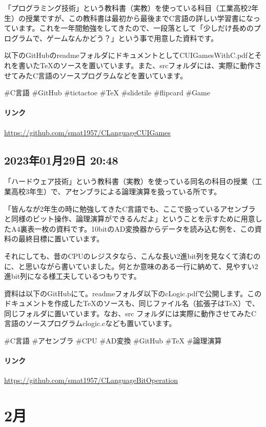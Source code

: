 \documentclass[facebook_diary.tex]{subfiles}
\begin{document}
「プログラミング技術」という教科書（実教）を使っている科目（工業高校2年生）の授業ですが、この教科書は最初から最後までC言語の詳しい学習書になっています。これを一年間勉強をしてきたので、一段落として「少しだけ長めのプログラムで、ゲームなんかどう？」という事で用意した資料です。


以下のGitHubのreadmeフォルダにドキュメントとしてCUIGamesWithC.pdfとそれを書いたTeXのソースを置いています。また、srcフォルダには、実際に動作させてみたC言語のソースプログラムなどを置いています。


\#C言語 \#GitHub \#tictactoe \#TeX \#slidetile \#flipcard \#Game

\paragraph{リンク}
\url{https://github.com/smat1957/CLanguageCUIGames}

\subsection*{2023年01月29日 20:48}

「ハードウェア技術」という教科書（実教）を使っている同名の科目の授業（工業高校3年生）で、アセンブラによる論理演算を扱っている所です。


「皆んなが2年生の時に勉強してきたC言語でも、ここで扱っているアセンブラと同様のビット操作、論理演算ができるんだよ」ということを示すために用意したA4裏表一枚の資料です。10bitのAD変換器からデータを読み込む例を、この資料の最終目標に置いています。

それにしても、昔のCPUのレジスタなら、こんな長い2進bit列を見なくて済むのに、と思いながら書いていました。何とか意味のある一行に納めて、見やすい2進bit列になる様工夫しているつもりです。


資料は以下のGitHubにて。readmeフォルダ以下のcLogic.pdfで公開します。このドキュメントを作成したTeXのソースも、同じファイル名（拡張子はTeX）で、同じフォルダに置いています。なお、src フォルダには実際に動作させてみたC言語のソースプログラムclogic.cなども置いています。


\#C言語 \#アセンブラ \#CPU \#AD変換 \#GitHub \#TeX \#論理演算

\paragraph{リンク}
\url{https://github.com/smat1957/CLanguageBitOperation}

\section{2月}
\end{document}
